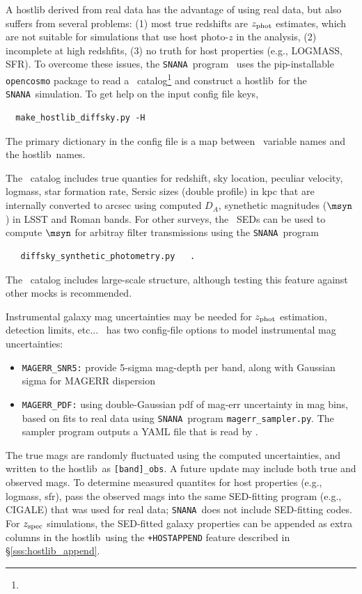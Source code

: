\documentclass[12pt]{article}
\newcommand{\snana}{{\tt SNANA}}
\newcommand{\hostlib}{{\sc hostlib}}
\newcommand{\Zphot}{z_{\rm phot}}
\newcommand{\Zspec}{z_{\rm spec}}
\begin{document}
{A {\hostlib} derived from real data has the advantage of using real data,
but also suffers from several problems: 
(1) most true redshifts are $\Zphot$ estimates, which are not suitable for
simulations that use host photo-$z$ in the analysis,
(2) incomplete at high redshfits,
(3) no truth for host properties (e.g., LOGMASS, SFR).
To overcome these issues, the \snana\ program  \makeDiffsky\
uses the pip-installable {\tt opencosmo} package to read a 
\diffsky\ catalog\footnote{\URLDIFFSKY} and construct a \hostlib\ for 
the \snana\ simulation.
To get help on the input config file keys,
\begin{verbatim}
  make_hostlib_diffsky.py -H
\end{verbatim}
The primary dictionary in the config file is a map between \diffsky\
variable names and the \hostlib\ names. 


The \diffsky\ catalog includes true quanties for
redshift,
sky location,
peculiar velocity,
logmass,
star formation rate,
Sersic sizes (double profile) in kpc that are internally converted to arcsec
using computed $D_A$,
synethetic magnitudes ($\msyn$) in LSST and Roman bands.
For other surveys, the \diffsky\ SEDs can be used to compute
$\msyn$ for arbitray filter transmissions using the \snana\ program 
%
\begin{verbatim}
   diffsky_synthetic_photometry.py   .
\end{verbatim}
%
The \diffsky\ catalog includes large-scale structure,
although testing this feature against other mocks is recommended.


Instrumental galaxy mag uncertainties may be needed for
$\Zphot$ estimation, detection limits, etc...
\makeDiffsky\ has two config-file options to model instrumental mag uncertainties:
\begin{itemize}
   \item \verb|MAGERR_SNR5:| provide 5-sigma mag-depth per band, along
         with Gaussian sigma for MAGERR dispersion
%
   \item \verb|MAGERR_PDF:| using double-Gaussian pdf of mag-err uncertainty
         in mag bins, based on fits to real data using \snana\ program
         \verb|magerr_sampler.py|.  The sampler program outputs a YAML file
         that is read by \makeDiffsky.
\end{itemize} 
%
The true mags are randomly fluctuated using the computed uncertainties,
and written to the \hostlib\ as \verb|[band]_obs|. A future update may
include both true and observed mags.
To determine measured quantites for host properties (e.g., logmass, sfr),
pass the observed mags into the same SED-fitting program (e.g., CIGALE)
that was used for real data;
\snana\ does not include SED-fitting codes.
For $\Zspec$ simulations, the SED-fitted galaxy properties can be
appended as extra columns in the \hostlib\ using the \verb|+HOSTAPPEND|
feature described in \S\ref{sss:hostlib_append}.


}
\end{document}

